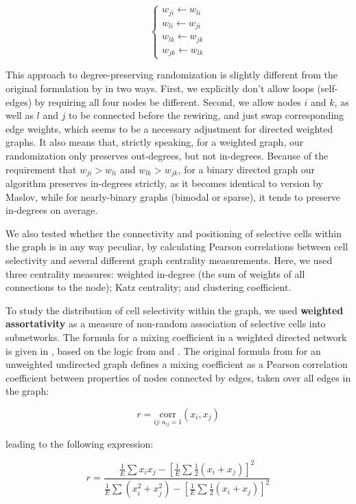 \documentclass{article}
\begin{document}
\[ \left \{ \begin{array}{l}  
w_{ji} \leftarrow w_{li} \\ 
w_{li} \leftarrow w_{ji} \\
w_{lk} \leftarrow w_{jk} \\
w_{jk} \leftarrow w_{lk}
\end{array} \right. \]

This approach to degree-preserving randomization is slightly different from the original formulation by \citep{maslov2002} in two ways. First, we explicitly don’t allow loops (self-edges) by requiring all four nodes be different. Second, we allow nodes $i$ and $k$, as well as $l$ and $j$ to be connected before the rewiring, and just swap corresponding edge weights, which seems to be a necessary adjustment for directed weighted graphs. It also means that, strictly speaking, for a weighted graph, our randomization only preserves out-degrees, but not in-degrees. Because of the requirement that $w_{ji}>w_{li}$ and $w_{lk}>w_{jk}$, for a binary directed graph our algorithm preserves in-degrees strictly, as it becomes identical to version by Maslov, while for nearly-binary graphs (bimodal or sparse), it tends to preserve in-degrees on average.

We also tested whether the connectivity and positioning of selective cells within the graph is in any way peculiar, by calculating Pearson correlations between cell selectivity and several different graph centrality measurements. Here, we used three centrality measures: weighted in-degree (the sum of weights of all connections to the node); Katz centrality; and clustering coefficient.

To study the distribution of cell selectivity within the graph, we used \textbf{weighted assortativity} as a measure of non-random association of selective cells into subnetworks. The formula for a mixing coefficient in a weighted directed network is given in \citep{farine2014weighted}, based on the logic from \citep{newman2003mixing} and \citep{leung2007weighted}. The original formula from \citep{newman2003mixing} for an unweighted undirected graph defines a mixing coefficient as a Pearson correlation coefficient between properties of nodes connected by edges, taken over all edges in the graph:

\[ r=\underset{ij: a_{ij}=1}{\text{corr}}(x_i,x_j) \]

leading to the following expression:

\[ r = \frac{\frac{1}{E} \sum{x_i x_j} - [\frac{1}{E} \sum{\frac{1}{2}(x_i+x_j)}]^2} {\frac{1}{E} \sum{(x_i^2+x_j^2)}-[\frac{1}{E} \sum{\frac{1}{2}(x_i+x_j)}]^2} \]
\end{document}
